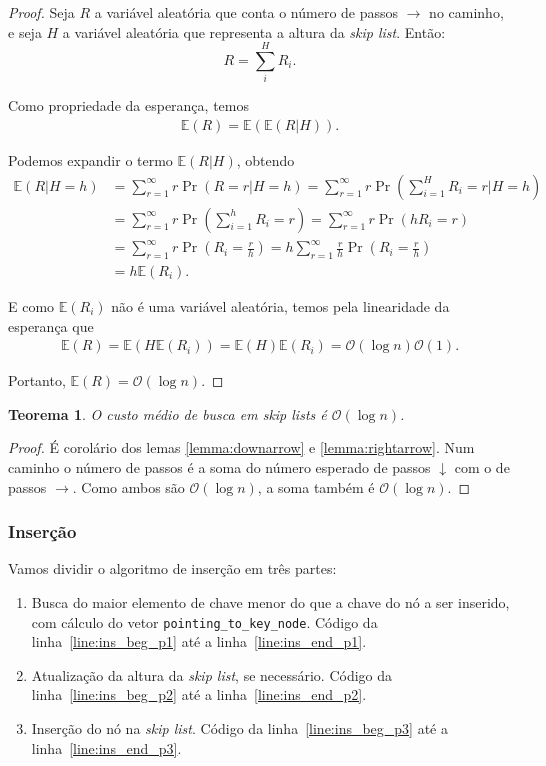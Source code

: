 \documentclass[paper=a4, fontsize=11pt]{scrartcl} %
\newtheorem{theorem}{Teorema}
\numberwithin{equation}{section}
\numberwithin{figure}{section}
\numberwithin{table}{section}
\numberwithin{definition}{section}
\numberwithin{theorem}{section}
\numberwithin{property}{section}
\numberwithin{proposition}{section}
\newcommand{\cO}{\ensuremath{\mathcal{O}}}
\newcommand{\sls}{\textit{skip lists}\xspace}
\newcommand{\skl}{\textit{skip list}\xspace}
\renewcommand{\sl}{\textit{skip list}\xspace}
\newcommand{\Exp}{\ensuremath{{\mathbb{E}}}\xspace}
\begin{document}
\begin{proof}
Seja $R$ a variável aleatória que conta o número de passos $\rightarrow$ no caminho, 
e seja $H$ a variável aleatória que representa a altura da \skl. Então:
$$
R = \sum_i^H R_i.
$$

Como propriedade da esperança, temos
\begin{align*}
\Exp(R) = \Exp(\Exp(R|H)).
\end{align*}

Podemos expandir o termo $\Exp(R|H)$, obtendo
\begin{align*}
\Exp(R|H = h)
  &= \sum_{r = 1}^{\infty} r \Pr(R = r | H = h) 
   = \sum_{r = 1}^{\infty} r \Pr \left( \sum_{i=1}^{H} R_i = r | H = h \right) \\
  &= \sum_{r = 1}^{\infty} r \Pr \left( \sum_{i=1}^{h} R_i = r \right) 
   = \sum_{r = 1}^{\infty} r \Pr \left( hR_i = r \right) \\
  &= \sum_{r = 1}^{\infty} r \Pr \left( R_i = \frac{r}{h} \right)   
   = h\sum_{r = 1}^{\infty} \frac{r}{h} \Pr \left( R_i = \frac{r}{h} \right) \\
  &= h \Exp(R_i).
\end{align*}

E como $\Exp(R_i)$ não é uma variável aleatória, temos pela linearidade da esperança que
\begin{align*}
\Exp(R) = \Exp(H \Exp(R_i)) = \Exp(H)\Exp(R_i)= \cO(\log n) \cO(1).
\end{align*}

Portanto, $\Exp(R) = \cO(\log n).$

\end{proof}

\begin{theorem}
O custo médio de busca em \sls é $\cO(\log n)$. 
\end{theorem}

\begin{proof}
É corolário dos lemas \ref{lemma:downarrow} e \ref{lemma:rightarrow}. Num caminho o número de passos
é a soma do número esperado de passos $\downarrow$ com o de passos $\rightarrow$. Como ambos são
$\cO(\log n)$, a soma também é $\cO(\log n)$.
\end{proof}

\subsubsection{Inserção}

Vamos dividir o algoritmo de inserção em três partes:
\begin{enumerate}[noitemsep]
  \item Busca do maior elemento de chave menor do que a chave do nó a ser inserido, com cálculo do vetor 
    \verb|pointing_to_key_node|. Código da linha~\ref{line:ins_beg_p1} até a linha~\ref{line:ins_end_p1}.
  \item Atualização da altura da \sl, se necessário. 
      Código da linha~\ref{line:ins_beg_p2} até a linha~\ref{line:ins_end_p2}.
  \item Inserção do nó na \sl. Código da linha~\ref{line:ins_beg_p3} até a linha~\ref{line:ins_end_p3}. 
\end{enumerate}
\end{document}
